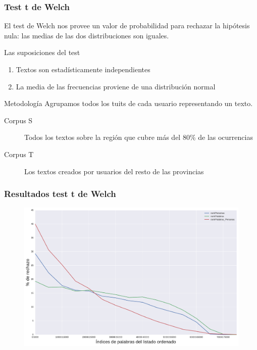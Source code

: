 \begin{frame}[c]\frametitle{Test t de Welch}

   El test de Welch nos provee un valor de probabilidad para rechazar la hipótesis nula: las medias de las dos distribuciones son iguales.

   
       Las suposiciones del test 
        \begin{enumerate}
            \item Textos son estadísticamente independientes 
            \item La media de las frecuencias proviene de una distribución normal
        \end{enumerate}
  
       \begin{block}{Metodología}
              Agrupamos todos los tuits de cada usuario representando un texto.
        \begin{description}
            \item[Corpus S] Todos los textos sobre la región que cubre más del 80\% de las ocurrencias
            \item[Corpus T] Los textos creados por usuarios del resto de las provincias
        \end{description}

        \end{block}
\end{frame}


\begin{frame}[c]\frametitle{Resultados test t de Welch}


  \begin{figure}
  \includegraphics[width=0.6\linewidth]{../src/images/rechazo_metricas.pdf}
  
  \end{figure}
            
\end{frame}
